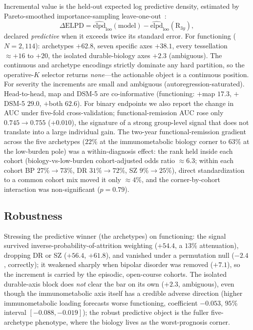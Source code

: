 Incremental value is the held-out expected log predictive density, estimated by
Pareto-smoothed importance-sampling leave-one-out~\citep{vehtari2017loo}:
\begin{equation}
  \Delta\mathrm{ELPD}=\widehat{\mathrm{elpd}}_{\text{loo}}(\text{model})-\widehat{\mathrm{elpd}}_{\text{loo}}(\mathrm R_{3y}),
\end{equation}
declared \emph{predictive} when it exceeds twice its standard error. For functioning
($N=2{,}114$): archetypes $+62.8$, seven specific axes $+38.1$, every tessellation
$\approx+16$ to $+20$, the isolated durable-biology axes $+2.3$ (ambiguous). The
continuous and archetype encodings strictly dominate any hard partition, so the
operative-$K$ selector returns \emph{none}---the actionable object is a continuous
position. For severity the increments are small and ambiguous
(autoregression-saturated). Head-to-head, map and DSM-5 are co-informative
(functioning: $+$map $17.3$, $+$DSM-5 $29.0$, $+$both $62.6$). For binary endpoints we
also report the change in AUC under five-fold cross-validation; functional-remission AUC
rose only $0.745\!\to\!0.755$ ($+0.010$), the signature of a strong group-level signal
that does not translate into a large individual gain. The two-year
functional-remission gradient across the five archetypes ($22\%$ at the immunometabolic
biology corner to $63\%$ at the low-burden pole) was a within-diagnosis effect: the rank
held inside each cohort (biology-vs-low-burden cohort-adjusted odds ratio $\approx6.3$;
within each cohort BP $27\%\!\to\!73\%$, DR $31\%\!\to\!72\%$, SZ $9\%\!\to\!25\%$),
direct standardization to a common cohort mix moved it only $\approx4\%$, and the
corner-by-cohort interaction was non-significant ($p=0.79$).

\subsection{Robustness}

Stressing the predictive winner (the archetypes) on functioning: the signal survived
inverse-probability-of-attrition weighting ($+54.4$, a $13\%$ attenuation), dropping DR
or SZ ($+56.4$, $+61.8$), and vanished under a permutation null ($-2.4$, correctly); it
weakened sharply when bipolar disorder was removed ($+7.1$), so the increment is carried
by the episodic, open-course cohorts. The isolated durable-axis block does \emph{not}
clear the bar on its own ($+2.3$, ambiguous), even though the immunometabolic axis itself
has a credible adverse direction (higher immunometabolic loading forecasts worse
functioning, coefficient $-0.053$, $95\%$ interval $[-0.088,-0.019]$); the robust
predictive object is the fuller five-archetype phenotype, where the biology lives as the
worst-prognosis corner.

